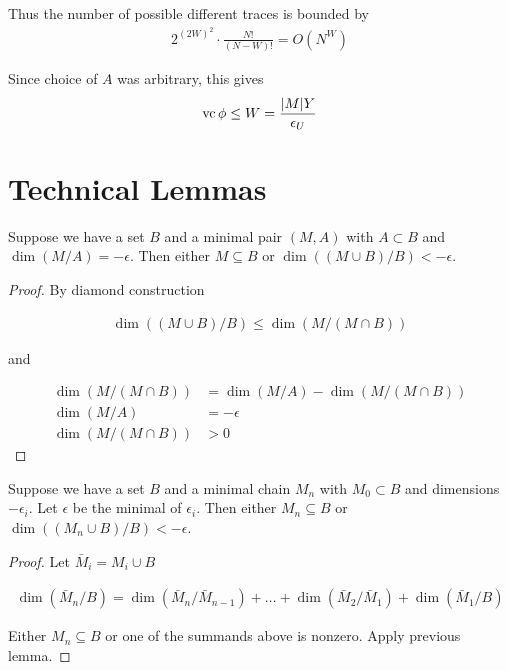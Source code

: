 \documentclass{amsart}
\begin{document}
Thus the number of possible different traces is bounded by 
\begin{align*}
	2^{(2W)^2} \cdot \frac{N!}{(N-W)!} = O(N^W)
\end{align*}

Since choice of $A$ was arbitrary, this gives
\begin{align*}
	\operatorname{vc}{\phi} \leq W = \frac{|M|Y}{\epsilon_U}
\end{align*}

\section{Technical Lemmas}

\begin{Lemma}
	Suppose we have a set $B$ and a minimal pair $(M, A)$ with $A \subset B$ and $\dim(M/A) = -\epsilon$.
Then either $M \subseteq B$ or $\dim((M \cup B)/B) < -\epsilon$.
\end{Lemma}

\begin{proof}
	By diamond construction

	\begin{align*}
		\dim((M \cup B)/B) \leq \dim(M / (M \cap B))
	\end{align*}

	and 

	\begin{align*}
		\dim(M / (M \cap B)) &= \dim (M/A) - \dim(M / (M \cap B)) \\
		\dim (M/A) &= -\epsilon \\
		\dim(M / (M \cap B)) &> 0
	\end{align*}
\end{proof}



\begin{Lemma}	\label{chain_lemma}
	Suppose we have a set $B$ and a minimal chain $M_n$ with $M_0 \subset B$ and dimensions $-\epsilon_i$.
Let $\epsilon$ be the minimal of $\epsilon_i$.
Then either $M_n \subseteq B$ or $\dim((M_n \cup B)/B) < -\epsilon$.
\end{Lemma}


\begin{proof}
	Let $\bar M_i = M_i \cup B$

	\begin{align*}
		\dim(\bar M_n/B) = \dim(\bar M_n/\bar M_{n-1}) + \ldots + \dim(\bar M_2/\bar M_1) + \dim(\bar M_1/B)
	\end{align*}

	Either $M_n \subseteq B$ or one of the summands above is nonzero.
	Apply previous lemma.
\end{proof}
\end{document}

